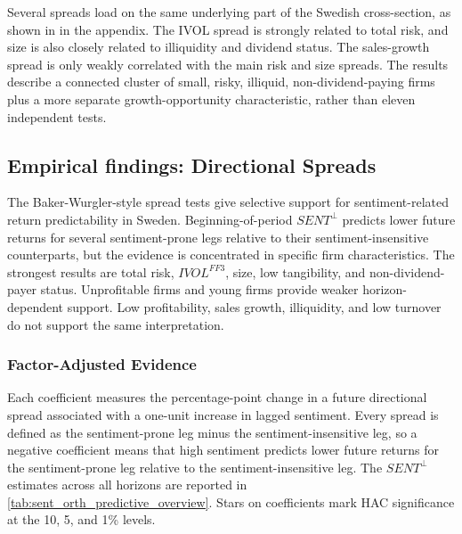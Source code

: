 \documentclass[11pt]{article}
\newcommand{\var}[1]{\ensuremath{#1}}
\begin{document}
Several spreads load on the same underlying part of the Swedish cross-section, as shown in  in the appendix. The IVOL spread is strongly related to total risk, and size is also closely related to illiquidity and dividend status. The sales-growth spread is only weakly correlated with the main risk and size spreads. The results describe a connected cluster of small, risky, illiquid, non-dividend-paying firms plus a more separate growth-opportunity characteristic, rather than eleven independent tests.

\subsection{Empirical findings: Directional Spreads}
The Baker-Wurgler-style spread tests give selective support for sentiment-related return predictability in Sweden. Beginning-of-period \var{SENT^{\perp}} predicts lower future returns for several sentiment-prone legs relative to their sentiment-insensitive counterparts, but the evidence is concentrated in specific firm characteristics. The strongest results are total risk, \var{IVOL^{FF3}}, size, low tangibility, and non-dividend-payer status. Unprofitable firms and young firms provide weaker horizon-dependent support. Low profitability, sales growth, illiquidity, and low turnover do not support the same interpretation.

\subsubsection{Factor-Adjusted Evidence}
Each coefficient measures the percentage-point change in a future directional spread associated with a one-unit increase in lagged sentiment. Every spread is defined as the sentiment-prone leg minus the sentiment-insensitive leg, so a negative coefficient means that high sentiment predicts lower future returns for the sentiment-prone leg relative to the sentiment-insensitive leg. The \var{SENT^{\perp}} estimates across all horizons are reported in \cref{tab:sent_orth_predictive_overview}. Stars on coefficients mark HAC significance at the 10, 5, and 1\% levels.
\end{document}
